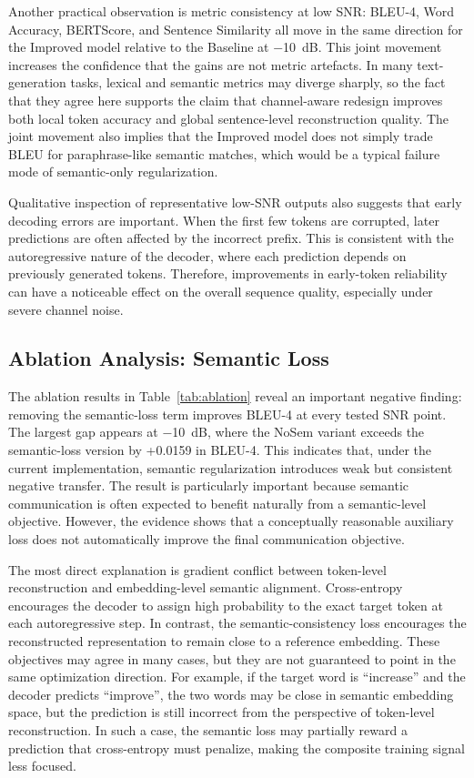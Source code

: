 Another practical observation is metric consistency at low SNR: BLEU-4, Word Accuracy, BERTScore, and Sentence Similarity all move in the same direction for the Improved model relative to the Baseline at \SI{-10}{dB}. This joint movement increases the confidence that the gains are not metric artefacts. In many text-generation tasks, lexical and semantic metrics may diverge sharply, so the fact that they agree here supports the claim that channel-aware redesign improves both local token accuracy and global sentence-level reconstruction quality. The joint movement also implies that the Improved model does not simply trade BLEU for paraphrase-like semantic matches, which would be a typical failure mode of semantic-only regularization.

Qualitative inspection of representative low-SNR outputs also suggests that early decoding errors are important. When the first few tokens are corrupted, later predictions are often affected by the incorrect prefix. This is consistent with the autoregressive nature of the decoder, where each prediction depends on previously generated tokens. Therefore, improvements in early-token reliability can have a noticeable effect on the overall sequence quality, especially under severe channel noise.

\FloatBarrier
\subsection{Ablation Analysis: Semantic Loss}

The ablation results in Table~\ref{tab:ablation} reveal an important negative finding: removing the semantic-loss term improves BLEU-4 at every tested SNR point. The largest gap appears at \SI{-10}{dB}, where the NoSem variant exceeds the semantic-loss version by +0.0159 in BLEU-4. This indicates that, under the current implementation, semantic regularization introduces weak but consistent negative transfer. The result is particularly important because semantic communication is often expected to benefit naturally from a semantic-level objective. However, the evidence shows that a conceptually reasonable auxiliary loss does not automatically improve the final communication objective.

The most direct explanation is gradient conflict between token-level reconstruction and embedding-level semantic alignment. Cross-entropy encourages the decoder to assign high probability to the exact target token at each autoregressive step. In contrast, the semantic-consistency loss encourages the reconstructed representation to remain close to a reference embedding. These objectives may agree in many cases, but they are not guaranteed to point in the same optimization direction. For example, if the target word is “increase” and the decoder predicts “improve”, the two words may be close in semantic embedding space, but the prediction is still incorrect from the perspective of token-level reconstruction. In such a case, the semantic loss may partially reward a prediction that cross-entropy must penalize, making the composite training signal less focused.

